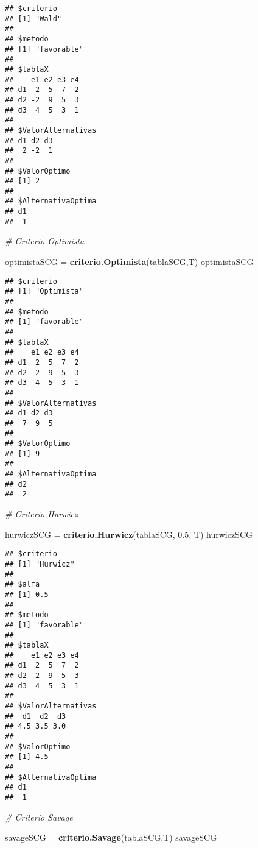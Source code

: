 \documentclass[
]{article}
\newenvironment{Shaded}{\begin{snugshade}}{\end{snugshade}}
\newcommand{\CommentTok}[1]{\textcolor[rgb]{0.56,0.35,0.01}{\textit{#1}}}
\newcommand{\FloatTok}[1]{\textcolor[rgb]{0.00,0.00,0.81}{#1}}
\newcommand{\FunctionTok}[1]{\textcolor[rgb]{0.13,0.29,0.53}{\textbf{#1}}}
\newcommand{\NormalTok}[1]{#1}
\newcommand{\OtherTok}[1]{\textcolor[rgb]{0.56,0.35,0.01}{#1}}
\begin{document}
\begin{verbatim}
## $criterio
## [1] "Wald"
## 
## $metodo
## [1] "favorable"
## 
## $tablaX
##    e1 e2 e3 e4
## d1  2  5  7  2
## d2 -2  9  5  3
## d3  4  5  3  1
## 
## $ValorAlternativas
## d1 d2 d3 
##  2 -2  1 
## 
## $ValorOptimo
## [1] 2
## 
## $AlternativaOptima
## d1 
##  1
\end{verbatim}

\begin{Shaded}
\begin{Highlighting}[]
\CommentTok{\# Criterio Optimista}

\NormalTok{optimistaSCG }\OtherTok{=} \FunctionTok{criterio.Optimista}\NormalTok{(tablaSCG,T)}
\NormalTok{optimistaSCG}
\end{Highlighting}
\end{Shaded}

\begin{verbatim}
## $criterio
## [1] "Optimista"
## 
## $metodo
## [1] "favorable"
## 
## $tablaX
##    e1 e2 e3 e4
## d1  2  5  7  2
## d2 -2  9  5  3
## d3  4  5  3  1
## 
## $ValorAlternativas
## d1 d2 d3 
##  7  9  5 
## 
## $ValorOptimo
## [1] 9
## 
## $AlternativaOptima
## d2 
##  2
\end{verbatim}

\begin{Shaded}
\begin{Highlighting}[]
\CommentTok{\# Criterio Hurwicz}

\NormalTok{hurwiczSCG }\OtherTok{=} \FunctionTok{criterio.Hurwicz}\NormalTok{(tablaSCG, }\FloatTok{0.5}\NormalTok{, T)}
\NormalTok{hurwiczSCG}
\end{Highlighting}
\end{Shaded}

\begin{verbatim}
## $criterio
## [1] "Hurwicz"
## 
## $alfa
## [1] 0.5
## 
## $metodo
## [1] "favorable"
## 
## $tablaX
##    e1 e2 e3 e4
## d1  2  5  7  2
## d2 -2  9  5  3
## d3  4  5  3  1
## 
## $ValorAlternativas
##  d1  d2  d3 
## 4.5 3.5 3.0 
## 
## $ValorOptimo
## [1] 4.5
## 
## $AlternativaOptima
## d1 
##  1
\end{verbatim}

\begin{Shaded}
\begin{Highlighting}[]
\CommentTok{\# Criterio Savage}

\NormalTok{savageSCG }\OtherTok{=} \FunctionTok{criterio.Savage}\NormalTok{(tablaSCG,T)}
\NormalTok{savageSCG}
\end{Highlighting}
\end{Shaded}
\end{document}
